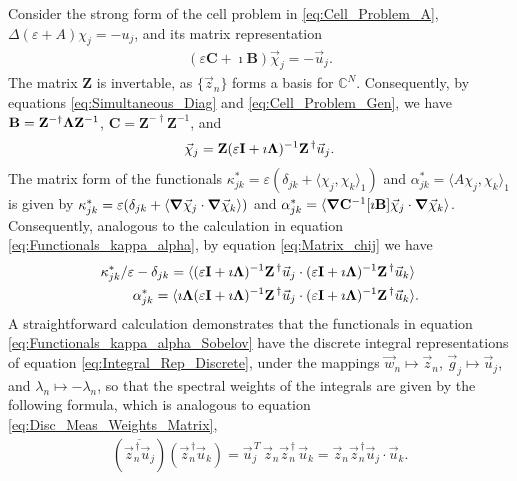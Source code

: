 \documentclass[11pt]{amsart}
\newcommand{\Ib}{\mathbf{I}}
\newcommand{\Bb}{\mathbf{B}}
\newcommand{\Cb}{\mathbf{C}}
\newcommand{\Zb}{\mathbf{Z}}
\newcommand\bLambda{\mbox{\boldmath${\Lambda}$}}
\newcommand\Bnabla{\mbox{\boldmath${\nabla}$}}
\begin{document}
Consider the strong form of the cell problem in
\eqref{eq:Cell_Problem_A}, $\Delta(\varepsilon+A)\chi_j=-u_j$, and its matrix
representation  
% 
\begin{align}\label{eq:Cell_Problem_Gen}
  (\varepsilon\Cb+\imath\Bb)\vec{\chi}_j=-\vec{u}_j.
\end{align}
%
The matrix $\Zb$ is invertable, as $\{\vec{z}_n\}$ forms a basis for
$\mathbb{C}^N$. Consequently, by equations
\eqref{eq:Simultaneous_Diag} and \eqref{eq:Cell_Problem_Gen}, we have
$\Bb=\Zb^{-\dagger}\bLambda\Zb^{-1}$, $\Cb=\Zb^{-\dagger}\Zb^{-1}$, and 
%
\begin{align}\label{eq:Matrix_chij}
  \vec{\chi}_j=\Zb(\varepsilon\Ib+\imath\bLambda)^{-1}\Zb^{\,\dagger}\vec{u}_j.
\end{align}
%
The matrix form of the functionals $\kappa^*_{jk}=\varepsilon(\delta_{jk}+\langle\chi_j,\chi_k\rangle_1)$
and $\alpha^*_{jk}=\langle A\chi_j,\chi_k\rangle_1$ is given by
$\kappa^*_{jk}=\varepsilon(\delta_{jk}+\langle\Bnabla\vec{\chi}_j\cdot\Bnabla\vec{\chi}_k\rangle)$ and
$\alpha^*_{jk}=\langle\Bnabla\Cb^{-1}[\imath\Bb]\vec{\chi}_j\cdot\Bnabla\vec{\chi}_k\rangle$.  
Consequently, analogous to the calculation in equation
\eqref{eq:Functionals_kappa_alpha}, by equation \eqref{eq:Matrix_chij}
we have  
% 
\begin{align}\label{eq:Functionals_kappa_alpha_Sobelov}
\kappa^*_{jk}/\varepsilon-\delta_{jk}=\langle&(\varepsilon\Ib+\imath\bLambda)^{-1}\Zb^{\,\dagger}\vec{u}_j\cdot(\varepsilon\Ib+\imath\bLambda)^{-1}\Zb^{\,\dagger}\vec{u}_k\rangle
\\
\alpha^*_{jk}=\langle\imath\bLambda&(\varepsilon\Ib+\imath\bLambda)^{-1}\Zb^{\,\dagger}\vec{u}_j\cdot(\varepsilon\Ib+\imath\bLambda)^{-1}\Zb^{\,\dagger}\vec{u}_k\rangle.
\notag
\end{align}
%
A straightforward calculation demonstrates that the functionals in equation 
\eqref{eq:Functionals_kappa_alpha_Sobelov} have the discrete integral
representations of equation \eqref{eq:Integral_Rep_Discrete}, under
the mappings $\vec{w}_n\mapsto\vec{z}_n$, $\vec{g}_j\mapsto\vec{u}_j$, and
$\lambda_n\mapsto-\lambda_n$, so that the spectral weights of the integrals are given by
the following formula, which is analogous to equation
\eqref{eq:Disc_Meas_Weights_Matrix},
%
\begin{align}\label{eq:Disc_Meas_Weights_Matrix_Sobelov}
  (\overline{\vec{z}_n^{\,\dagger}\vec{u}_j})(\vec{z}_n^{\,\dagger}\vec{u}_k)
  =\vec{u}_j^{\,T}\,\vec{z}_n\vec{z}_n^{\,\dagger}\,\vec{u}_k
  =\vec{z}_n\vec{z}_n^{\,\dagger}\vec{u}_j\cdot\vec{u}_k.
\end{align}
%
\end{document}
